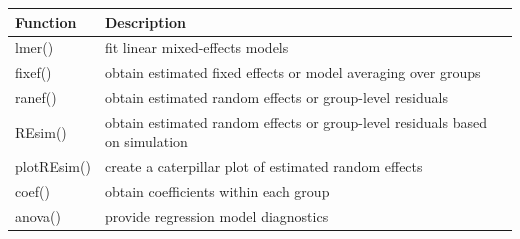 \documentclass[]{book}
\begin{document}
\begin{longtable}[]{@{}ll@{}}
\toprule
\begin{minipage}[b]{0.14\columnwidth}\raggedright\strut
Function\strut
\end{minipage} & \begin{minipage}[b]{0.60\columnwidth}\raggedright\strut
Description\strut
\end{minipage}\tabularnewline
\midrule
\endhead
\begin{minipage}[t]{0.14\columnwidth}\raggedright\strut
lmer()\strut
\end{minipage} & \begin{minipage}[t]{0.60\columnwidth}\raggedright\strut
fit linear mixed-effects models\strut
\end{minipage}\tabularnewline
\begin{minipage}[t]{0.14\columnwidth}\raggedright\strut
fixef()\strut
\end{minipage} & \begin{minipage}[t]{0.60\columnwidth}\raggedright\strut
obtain estimated fixed effects or model averaging over groups\strut
\end{minipage}\tabularnewline
\begin{minipage}[t]{0.14\columnwidth}\raggedright\strut
ranef()\strut
\end{minipage} & \begin{minipage}[t]{0.60\columnwidth}\raggedright\strut
obtain estimated random effects or group-level residuals\strut
\end{minipage}\tabularnewline
\begin{minipage}[t]{0.14\columnwidth}\raggedright\strut
REsim()\strut
\end{minipage} & \begin{minipage}[t]{0.60\columnwidth}\raggedright\strut
obtain estimated random effects or group-level residuals based on
simulation\strut
\end{minipage}\tabularnewline
\begin{minipage}[t]{0.14\columnwidth}\raggedright\strut
plotREsim()\strut
\end{minipage} & \begin{minipage}[t]{0.60\columnwidth}\raggedright\strut
create a caterpillar plot of estimated random effects\strut
\end{minipage}\tabularnewline
\begin{minipage}[t]{0.14\columnwidth}\raggedright\strut
coef()\strut
\end{minipage} & \begin{minipage}[t]{0.60\columnwidth}\raggedright\strut
obtain coefficients within each group\strut
\end{minipage}\tabularnewline
\begin{minipage}[t]{0.14\columnwidth}\raggedright\strut
anova()\strut
\end{minipage} & \begin{minipage}[t]{0.60\columnwidth}\raggedright\strut
provide regression model diagnostics\strut
\end{minipage}\tabularnewline
\bottomrule
\end{longtable}
\end{document}
